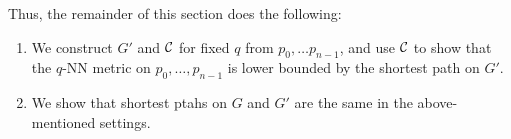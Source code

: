 Thus, the remainder of this section does the following: 
\begin{enumerate}
\item We construct $G'$ and $\mathcal{C}$ for fixed $q$ from $p_0, \ldots
p_{n-1}$, and use $\mathcal{C}$ to show that the $q$-NN metric on $p_0, \ldots,
p_{n-1}$ is lower bounded by the shortest path on $G'$.
\item We show that shortest ptahs on $G$ and $G'$ are the same in the
above-mentioned settings.
\end{enumerate}

